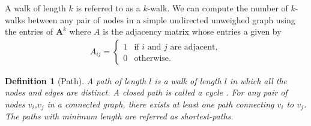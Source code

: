 \documentclass[10pt,a4paper]{article}
\newtheorem{defn}{Definition}
\newtheorem{exa}{Example}
\begin{document}
A walk of length $k$ is referred to as a $k$-walk. We can compute the number of $k$-walks between any pair of nodes in a simple undirected unweighed graph using the entries of $\mathbf{A}^k$ where $A$ is the adjacency matrix whose entries a given by
\begin{eqnarray}
A_{ij} = \begin{cases} 1 &\mbox{if } i \text{ and } j \text{ are adjacent}, \\
0 & \text{otherwise}.
\end{cases}
\end{eqnarray}



\begin{defn}[Path]
	A path of length $l$ is a walk of length $l$ in which all the nodes and edges are distinct. A closed path is called a cycle \citep{estrada2011structure}. For any pair of nodes $v_i$,$v_j$ in a connected graph, there exists at least one path connecting $v_i$ to $v_j$. The paths with minimum length are referred as shortest-paths.
\end{defn}
\end{document}
